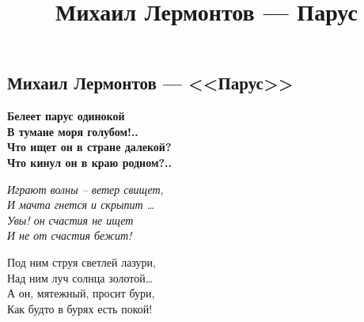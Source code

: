 \documentclass[a4paper, 12pt]{article}
\title{Михаил Лермонтов — Парус}
\begin{document}
\parinden 

\begin{center}
\section*{Михаил Лермонтов — <<Парус>>}
\end{center}

\begin{flushleft}
\bf{Белеет парус одинокой\\
В тумане моря голубом!..\\
Что ищет он в стране далекой?\\
Что кинул он в краю родном?..\\}
\end{flushleft}

\begin{center}
\it{Играют волны -- ветер свищет,\\
И мачта гнется и скрыпит \ldots\\
Увы! он счастия не ищет\\
И не от счастия бежит!\\}
\end{center}

\begin{flushright}
Под ним струя светлей лазури,\\
Над ним луч солнца золотой…\\
А он, мятежный, просит бури,\\
Как будто в бурях есть покой!\\
\end{flushright}
\end{document}
